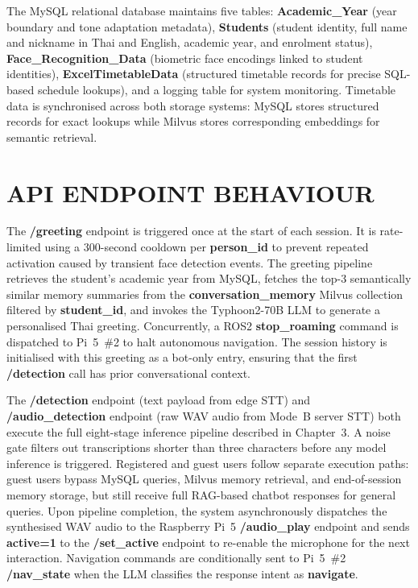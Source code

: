 The MySQL relational database maintains five tables: \textbf{Academic\_Year} (year boundary and tone adaptation metadata), \textbf{Students} (student identity, full name and nickname in Thai and English, academic year, and enrolment status), \textbf{Face\_Recognition\_Data} (biometric face encodings linked to student identities), \textbf{ExcelTimetableData} (structured timetable records for precise SQL-based schedule lookups), and a logging table for system monitoring. Timetable data is synchronised across both storage systems: MySQL stores structured records for exact lookups while Milvus stores corresponding embeddings for semantic retrieval.

\section{API ENDPOINT BEHAVIOUR}

The \textbf{/greeting} endpoint is triggered once at the start of each session. It is rate-limited using a 300-second cooldown per \textbf{person\_id} to prevent repeated activation caused by transient face detection events. The greeting pipeline retrieves the student's academic year from MySQL, fetches the top-3 semantically similar memory summaries from the \textbf{conversation\_memory} Milvus collection filtered by \textbf{student\_id}, and invokes the Typhoon2-70B LLM to generate a personalised Thai greeting. Concurrently, a ROS2 \textbf{stop\_roaming} command is dispatched to Pi~5~\#2 to halt autonomous navigation. The session history is initialised with this greeting as a bot-only entry, ensuring that the first \textbf{/detection} call has prior conversational context.

The \textbf{/detection} endpoint (text payload from edge STT) and \textbf{/audio\_detection} endpoint (raw WAV audio from Mode~B server STT) both execute the full eight-stage inference pipeline described in Chapter~3. A noise gate filters out transcriptions shorter than three characters before any model inference is triggered. Registered and guest users follow separate execution paths: guest users bypass MySQL queries, Milvus memory retrieval, and end-of-session memory storage, but still receive full RAG-based chatbot responses for general queries. Upon pipeline completion, the system asynchronously dispatches the synthesised WAV audio to the Raspberry Pi~5 \textbf{/audio\_play} endpoint and sends \textbf{active=1} to the \textbf{/set\_active} endpoint to re-enable the microphone for the next interaction. Navigation commands are conditionally sent to Pi~5~\#2 \textbf{/nav\_state} when the LLM classifies the response intent as \textbf{navigate}.

